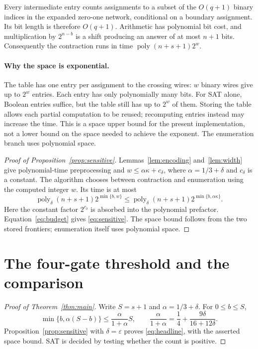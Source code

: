 \documentclass[11pt]{article}
\newcommand{\poly}{\operatorname{poly}}
\begin{document}
Every intermediate entry counts assignments to a subset of the
$O(q+1)$ binary indices in the expanded zero-one network, conditional
on a boundary assignment. Its bit length is therefore $O(q+1)$.
Arithmetic has polynomial bit cost, and multiplication by $2^{n-b}$
is a shift producing an answer of at most $n+1$ bits. Consequently
the contraction runs in time $\poly(n+s+1)2^w$.

\paragraph{Why the space is exponential.}
The table has one entry per assignment to the crossing wires:
$w$ binary wires give up to $2^w$ entries. Each entry has only
polynomially many bits. For SAT alone, Boolean entries suffice,
but the table still has up to $2^w$ of them. Storing the table allows
each partial computation to be reused; recomputing entries instead
may increase the time. This is a space upper bound for the present
implementation, not a lower bound on the space needed to achieve
the exponent. The enumeration branch uses polynomial space.

\begin{proof}[Proof of Proposition~\ref{prop:sensitive}]
Lemmas~\ref{lem:encoding} and~\ref{lem:width} give polynomial-time
preprocessing and $w\le\alpha\kappa+c_\delta$, where
$\alpha=1/3+\delta$ and $c_\delta$ is a constant.
The algorithm chooses between contraction and enumeration using
the computed integer $w$. Its time is at most
\[
 \poly_\delta(n+s+1)2^{\min\{b,w\}}
 \le\poly_\delta(n+s+1)2^{\min\{b,\alpha\kappa\}}.
\]
Here the constant factor $2^{c_\delta}$ is absorbed into the
polynomial prefactor. Equation~\eqref{eq:budget} gives
\eqref{eq:sensitive}. The space bound follows from the two stored
frontiers; enumeration itself uses polynomial space.
\end{proof}

\section{The four-gate threshold and the comparison}

\begin{proof}[Proof of Theorem~\ref{thm:main}]
Write $S=s+1$ and $\alpha=1/3+\delta$. For $0\le b\le S$,
\[
 \min\{b,\alpha(S-b)\}\le\frac{\alpha}{1+\alpha}S,
 \qquad
 \frac{\alpha}{1+\alpha}
 =\frac14+\frac{9\delta}{16+12\delta}.
\]
Proposition~\ref{prop:sensitive} with $\delta=\varepsilon$ proves
\eqref{eq:headline}, with the asserted space bound. SAT is decided
by testing whether the count is positive.
\end{proof}
\end{document}
